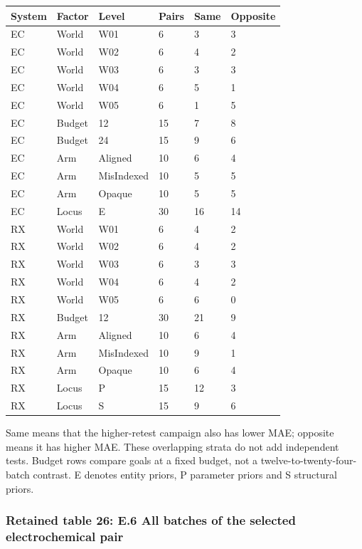 \documentclass[10pt,a4paper]{article}
\begin{document}
{\def\LTcaptype{table} %
\small\begin{longtable}[]{@{}llllll@{}}
\toprule\noalign{}
System & Factor & Level & Pairs & Same & Opposite \\
\midrule\noalign{}
\endhead
\bottomrule\noalign{}
\endlastfoot
EC & World & W01 & 6 & 3 & 3 \\
EC & World & W02 & 6 & 4 & 2 \\
EC & World & W03 & 6 & 3 & 3 \\
EC & World & W04 & 6 & 5 & 1 \\
EC & World & W05 & 6 & 1 & 5 \\
EC & Budget & 12 & 15 & 7 & 8 \\
EC & Budget & 24 & 15 & 9 & 6 \\
EC & Arm & Aligned & 10 & 6 & 4 \\
EC & Arm & MisIndexed & 10 & 5 & 5 \\
EC & Arm & Opaque & 10 & 5 & 5 \\
EC & Locus & E & 30 & 16 & 14 \\
RX & World & W01 & 6 & 4 & 2 \\
RX & World & W02 & 6 & 4 & 2 \\
RX & World & W03 & 6 & 3 & 3 \\
RX & World & W04 & 6 & 4 & 2 \\
RX & World & W05 & 6 & 6 & 0 \\
RX & Budget & 12 & 30 & 21 & 9 \\
RX & Arm & Aligned & 10 & 6 & 4 \\
RX & Arm & MisIndexed & 10 & 9 & 1 \\
RX & Arm & Opaque & 10 & 6 & 4 \\
RX & Locus & P & 15 & 12 & 3 \\
RX & Locus & S & 15 & 9 & 6 \\
\end{longtable}\normalsize
}

Same means that the higher-retest campaign also has lower MAE; opposite means it has higher MAE. These overlapping strata do not add independent tests. Budget rows compare goals at a fixed budget, not a twelve-to-twenty-four-batch contrast. E denotes entity priors, P parameter priors and S structural priors.

\subsubsection{Retained table 26: E.6 All batches of the selected electrochemical pair}\label{retained-table-26-e.6-all-batches-of-the-selected-electrochemical-pair}
\end{document}
